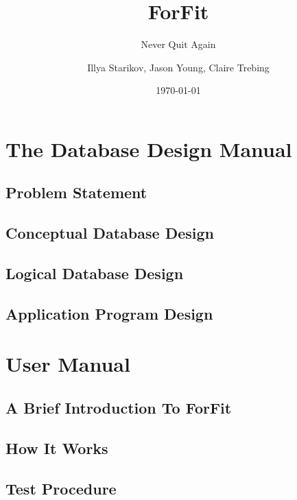 \documentclass[oneside]{scrbook}
\title{ForFit}
\subtitle{Never Quit Again}
\author{Illya Starikov, Jason Young, Claire Trebing}
\date{\today}
\begin{document}
\maketitle
\tableofcontents

\part{The Database Design Manual}
\chapter{Problem Statement}


\chapter{Conceptual Database Design}


\chapter{Logical Database Design}


\chapter{Application Program Design}


\part{User Manual}
\chapter{A Brief Introduction To ForFit}


\chapter{How It Works}


\chapter{Test Procedure}

\end{document}
